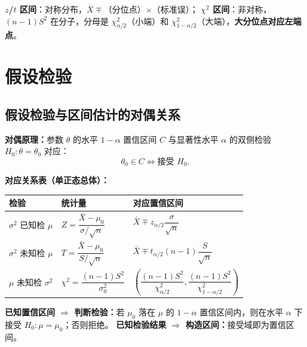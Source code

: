 \documentclass[11pt,a4paper]{article}
\begin{document}
\begin{examtip}[分位点记忆口诀]
\textbf{$z$/$t$ 区间}：对称分布，$\bar X\mp$（分位点）$\times$（标准误）；
\textbf{$\chi^2$ 区间}：非对称，$(n-1)S^2$ 在分子，分母是 $\chi^2_{\alpha/2}$（小端）和 $\chi^2_{1-\alpha/2}$（大端），\textbf{大分位点对应左端点}。
\end{examtip}

\section{假设检验}

\subsection{假设检验与区间估计的对偶关系}

\begin{variation}[检验与置信区间的对偶]
\textbf{对偶原理：}参数 $\theta$ 的水平 $1-\alpha$ 置信区间 $C$ 与显著性水平 $\alpha$ 的双侧检验 $H_0:\theta=\theta_0$ 对应：
\[
\theta_0 \in C \iff \text{接受 } H_0.
\]

\textbf{对应关系表（单正态总体）：}
\begin{center}
\begin{tabular}{lll}
\toprule
检验 & 统计量 & 对应置信区间 \\
\midrule
$\sigma^2$ 已知检 $\mu$ & $Z=\dfrac{\bar X-\mu_0}{\sigma/\sqrt n}$ & $\bar X\mp z_{\alpha/2}\dfrac{\sigma}{\sqrt n}$ \\
$\sigma^2$ 未知检 $\mu$ & $T=\dfrac{\bar X-\mu_0}{S/\sqrt n}$ & $\bar X\mp t_{\alpha/2}(n-1)\dfrac{S}{\sqrt n}$ \\
$\mu$ 未知检 $\sigma^2$ & $\chi^2=\dfrac{(n-1)S^2}{\sigma_0^2}$ & $\left(\dfrac{(n-1)S^2}{\chi^2_{\alpha/2}},\dfrac{(n-1)S^2}{\chi^2_{1-\alpha/2}}\right)$ \\
\bottomrule
\end{tabular}
\end{center}
\end{variation}

\begin{keypoint}[对偶关系的应用]
\textbf{已知置信区间 $\Rightarrow$ 判断检验：}若 $\mu_0$ 落在 $\mu$ 的 $1-\alpha$ 置信区间内，则在水平 $\alpha$ 下接受 $H_0:\mu=\mu_0$；否则拒绝。
\textbf{已知检验结果 $\Rightarrow$ 构造区间：}接受域即为置信区间。
\end{keypoint}
\end{document}
